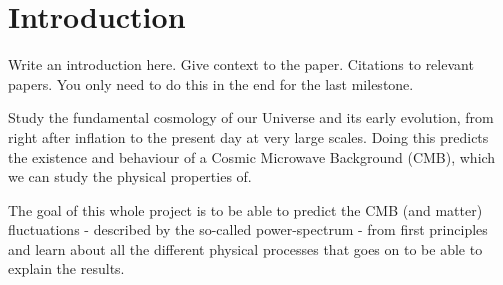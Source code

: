 \section{Introduction}

Write an introduction here. 
Give context to the paper. 
Citations to relevant papers. 
You only need to do this in the end for the last milestone.

Study the fundamental cosmology of our Universe and its early evolution, from right after inflation to the present day at very large scales. Doing this predicts the existence and behaviour of a Cosmic Microwave Background (CMB), which we can study the physical properties of.

The goal of this whole project is to be able to predict the CMB (and matter) fluctuations - described by the so-called power-spectrum - from first principles and learn about all the different physical processes that goes on to be able to explain the results. 
   
